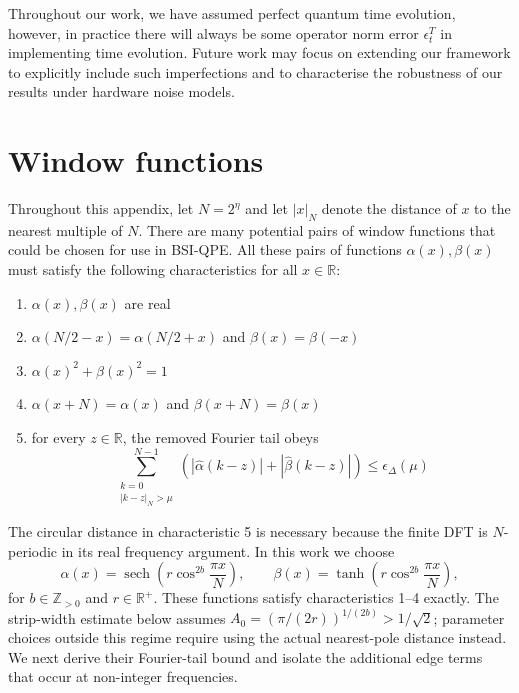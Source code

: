 \documentclass[aps,floatfix,10pt,amssymb,amsfont,amsmath,superscriptaddress,float,nofootinbib,longbibliography,nobalancelastpage,twocolumn]{revtex4-2}
\begin{document}
Throughout our work, we have assumed perfect quantum time evolution, however, in practice there will always be some operator norm error $\epsilon^T_t$ in implementing time evolution. Future work may focus on extending our framework to explicitly include such imperfections and to characterise the robustness of our results under hardware noise models.



\appendix
\onecolumngrid    
\section{Window functions}
\label{section:appendix}
Throughout this appendix, let $N=2^{\eta}$ and let $|x|_N$ denote the distance of $x$ to the nearest multiple of $N$. There are many potential pairs of window functions that could be chosen for use in BSI-QPE. All these pairs of functions $\alpha(x), \beta(x)$ must satisfy the following characteristics for all $x \in \mathbb{R}$:
\begin{enumerate}
    \item $\alpha(x), \beta(x)$ are real
    \item $\alpha(N/2-x) = \alpha(N/2+x)$ and $\beta(x) = \beta(-x)$
    \item $\alpha(x)^2+\beta(x)^2 =1$
    \item $\alpha(x+N) = \alpha(x)$ and $\beta(x+N) = \beta(x)$
    \item for every $z\in\mathbb R$, the removed Fourier tail obeys
    \begin{equation*}
      \sum_{\substack{k=0\\|k-z|_N>\mu}}^{N-1}
      \left(|\hat\alpha(k-z)|+|\hat\beta(k-z)|\right)
      \leq\epsilon_\Delta(\mu)
    \end{equation*}
\end{enumerate}
The circular distance in characteristic 5 is necessary because the finite DFT is $N$-periodic in its real frequency argument. In this work we choose
\begin{equation}
    \alpha(x)=\operatorname{sech}\!\left(r\cos^{2b}\frac{\pi x}{N}\right),\qquad
    \beta(x)=\operatorname{tanh}\!\left(r\cos^{2b}\frac{\pi x}{N}\right),
\end{equation}
for $b\in\mathbb{Z}_{>0}$ and $r\in\mathbb{R}^{+}$. These functions satisfy
characteristics 1--4 exactly.  The strip-width estimate below assumes
$A_0=(\pi/(2r))^{1/(2b)}>1/\sqrt2$; parameter choices outside this regime
require using the actual nearest-pole distance instead. We next derive their
Fourier-tail bound and isolate the additional edge terms that occur at
non-integer frequencies.
\end{document}
